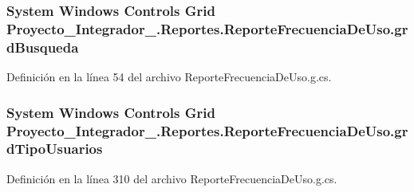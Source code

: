 \hypertarget{class_proyecto___integrador__3_1_1_reportes_1_1_reporte_frecuencia_de_uso_af86d8cdcb91a2f6d6954bf44f4ad2b6c}{
\subsubsection[{grd\-Busqueda}]{\setlength{\rightskip}{0pt plus 5cm}System Windows Controls Grid Proyecto\-\_\-\-Integrador\-\_.\-Reportes.\-Reporte\-Frecuencia\-De\-Uso.\-grd\-Busqueda\hspace{0.3cm}{\ttfamily [package]}}}\label{class_proyecto___integrador__3_1_1_reportes_1_1_reporte_frecuencia_de_uso_af86d8cdcb91a2f6d6954bf44f4ad2b6c}


Definición en la línea 54 del archivo Reporte\-Frecuencia\-De\-Uso.\-g.\-cs.

\hypertarget{class_proyecto___integrador__3_1_1_reportes_1_1_reporte_frecuencia_de_uso_a07daaedf61ed6ed6d9b36a92b037dd53}{
\subsubsection[{grd\-Tipo\-Usuarios}]{\setlength{\rightskip}{0pt plus 5cm}System Windows Controls Grid Proyecto\-\_\-\-Integrador\-\_.\-Reportes.\-Reporte\-Frecuencia\-De\-Uso.\-grd\-Tipo\-Usuarios\hspace{0.3cm}{\ttfamily [package]}}}\label{class_proyecto___integrador__3_1_1_reportes_1_1_reporte_frecuencia_de_uso_a07daaedf61ed6ed6d9b36a92b037dd53}


Definición en la línea 310 del archivo Reporte\-Frecuencia\-De\-Uso.\-g.\-cs.

